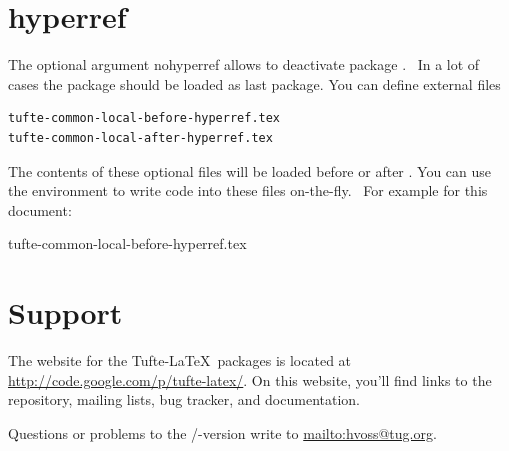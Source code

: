 

\section{hyperref}\label{sec:hyperref}
The optional argument \textsf{nohyperref} allows to deactivate package 
.~\parencite{ctan-hyperref} In a lot of cases the package
 should be loaded as last package. You can define external files

\begin{verbatim}
tufte-common-local-before-hyperref.tex
tufte-common-local-after-hyperref.tex
\end{verbatim}

The contents of these optional files will be loaded before or after .
You can use the environment  to write code into these 
files on-the-fly.~\nocite{ctan-hyperref}
For example for this document:

\begin{codeblock}[title=Before \texttt{hyperref} loaded Code.]
\begin{filecontents}{tufte-common-local-before-hyperref.tex}
\usepackage{amsmath}
\usepackage{graphicx} %
  \graphicspath{{graphics/}} %
\usepackage{booktabs} %
\usepackage{multicol} %
\usepackage{lipsum}   %
\usepackage{fancyvrb} %
\usepackage{minted-code}
\usepackage{xspace}
\usepackage{siunitx}

\usepackage{makeidx}\makeindex
\end{filecontents}
\end{codeblock}



\backmatter

\section{Support}\label{sec:support}

The website for the Tufte-\LaTeX\ packages is located at
\url{http://code.google.com/p/tufte-latex/}.  On this website, you'll find
links to the  repository, mailing lists, bug tracker, and documentation.

Questions or problems to the \XeLaTeX/\LuaLaTeX-version write to
\url{mailto:hvoss@tug.org}.

\printbibliography

\printindex




